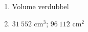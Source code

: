 {\begin{multicols}{3}
\begin{enumerate}[noitemsep, label=\textbf{\arabic*}. ] 
 \item Volume verdubbel%
\setcounter{enumi}{2}
\item $31~552$ cm$^3$; $96~112$ cm$^2$ %
\end{enumerate}


\end{multicols}}
